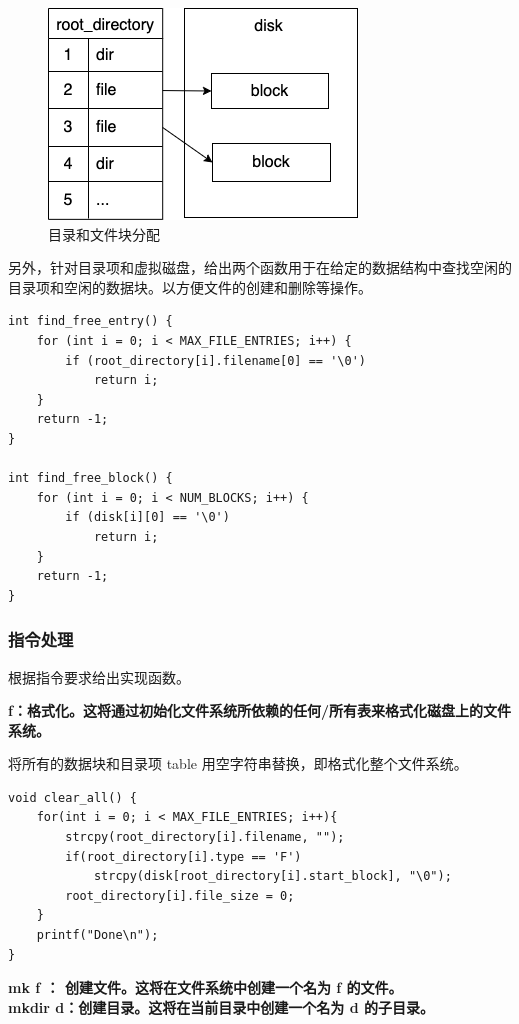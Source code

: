 \documentclass{article}
\begin{document}
\begin{figure}[H]
\center
\includegraphics[scale = 0.6]{s2-2.png}
\caption{目录和文件块分配}
\label{s2-2}
\end{figure}

另外，针对目录项和虚拟磁盘，给出两个函数用于在给定的数据结构中查找空闲的目录项和空闲的数据块。以方便文件的创建和删除等操作。

\begin{lstlisting}
int find_free_entry() {
    for (int i = 0; i < MAX_FILE_ENTRIES; i++) {
        if (root_directory[i].filename[0] == '\0')
            return i;
    }
    return -1;
}

int find_free_block() {
    for (int i = 0; i < NUM_BLOCKS; i++) {
        if (disk[i][0] == '\0')
            return i;
    }
    return -1;
}
\end{lstlisting}

\subsubsection{指令处理}

根据指令要求给出实现函数。

\noindent\textbf{f：格式化。这将通过初始化文件系统所依赖的任何/所有表来格式化磁盘上的文件系统。}

将所有的数据块和目录项 table 用空字符串替换，即格式化整个文件系统。

\begin{lstlisting}
void clear_all() {
    for(int i = 0; i < MAX_FILE_ENTRIES; i++){
        strcpy(root_directory[i].filename, "");
        if(root_directory[i].type == 'F')
            strcpy(disk[root_directory[i].start_block], "\0");
        root_directory[i].file_size = 0;
    }
    printf("Done\n");
}
\end{lstlisting}

\noindent\textbf{mk f ： 创建文件。这将在文件系统中创建一个名为 f 的文件。\\ 
mkdir d：创建目录。这将在当前目录中创建一个名为 d 的子目录。}
\end{document}
